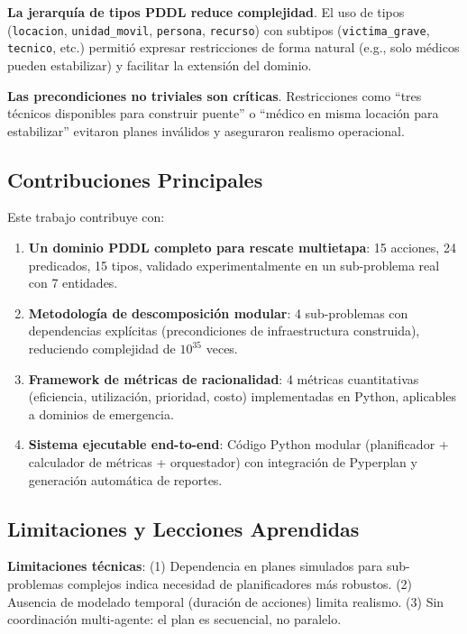 \documentclass[conference]{IEEEtran}
\begin{document}
    \textbf{La jerarquía de tipos PDDL reduce complejidad}. El uso de tipos (\texttt{locacion}, \texttt{unidad\_movil}, \texttt{persona}, \texttt{recurso}) con subtipos (\texttt{victima\_grave}, \texttt{tecnico}, etc.) permitió expresar restricciones de forma natural (e.g., solo médicos pueden estabilizar) y facilitar la extensión del dominio.

    \textbf{Las precondiciones no triviales son críticas}. Restricciones como ``tres técnicos disponibles para construir puente'' o ``médico en misma locación para estabilizar'' evitaron planes inválidos y aseguraron realismo operacional.

    \subsection{Contribuciones Principales}

    Este trabajo contribuye con:
    \begin{enumerate}[leftmargin=*,itemsep=1pt]
    \item \textbf{Un dominio PDDL completo para rescate multietapa}: 15 acciones, 24 predicados, 15 tipos, validado experimentalmente en un sub-problema real con 7 entidades.
    \item \textbf{Metodología de descomposición modular}: 4 sub-problemas con dependencias explícitas (precondiciones de infraestructura construida), reduciendo complejidad de $10^{35}$ veces.
    \item \textbf{Framework de métricas de racionalidad}: 4 métricas cuantitativas (eficiencia, utilización, prioridad, costo) implementadas en Python, aplicables a dominios de emergencia.
    \item \textbf{Sistema ejecutable end-to-end}: Código Python modular (planificador + calculador de métricas + orquestador) con integración de Pyperplan y generación automática de reportes.
    \end{enumerate}

    \subsection{Limitaciones y Lecciones Aprendidas}

    \textbf{Limitaciones técnicas}: (1) Dependencia en planes simulados para sub-problemas complejos indica necesidad de planificadores más robustos. (2) Ausencia de modelado temporal (duración de acciones) limita realismo. (3) Sin coordinación multi-agente: el plan es secuencial, no paralelo.
\end{document}
